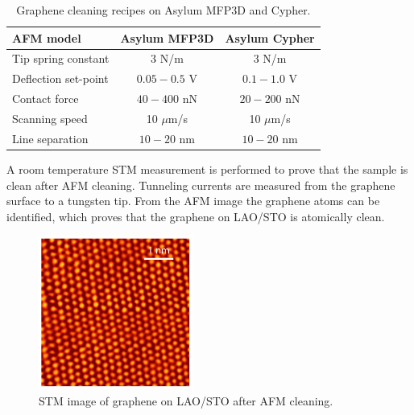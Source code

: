 \documentclass[pdflatex, sectionletters, 12pt]{pittetd}    %
\begin{document}
\begin{table}[h!]
	\centering
	\begin{tabular}{l|cc}
		\hline
		AFM model    &    Asylum MFP3D    &    Asylum Cypher \\ \hline
		Tip spring constant    &    3 N/m    & 3 N/m    \\ 
		Deflection set-point    &    $0.05 - 0.5$ V    &    $0.1 - 1.0$ V    \\        
		Contact force    &    $40 - 400$ nN    &    $20 - 200$ nN    \\
		Scanning speed    &    10 $\mu$m/s    &    10 $\mu$m/s \\ 
		Line separation    &    $10 - 20$ nm    &    $10 - 20$ nm    \\ \hline
	\end{tabular}
	\caption{Graphene cleaning recipes on Asylum MFP3D and Cypher.}
	\label{TAB:AFMCleaning}
	
\end{table}

A room temperature STM measurement is performed to prove that the sample is clean after AFM cleaning. Tunneling currents are measured from the graphene surface to a tungsten tip. From the AFM image the graphene atoms can be identified, which proves that the graphene on LAO/STO is atomically clean. 
\\

\begin{figure}[h!]
	\centering
	\includegraphics[width=0.45\textwidth]{Drawing/GrapheneSTM.pdf}
	\caption{STM image of graphene on LAO/STO after AFM cleaning.}
	\label{FIG:GrapheneSTM}
\end{figure}

\end{document}
